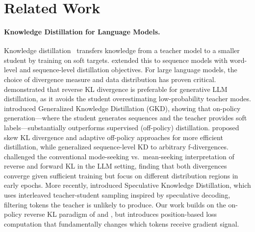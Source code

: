 
\section{Related Work}
\label{sec:related_work}

\paragraph{Knowledge Distillation for Language Models.}
Knowledge distillation~\citep{hinton2015distilling} transfers knowledge from a teacher model to a smaller student by training on soft targets.
\citet{kim2016sequence} extended this to sequence models with word-level and sequence-level distillation objectives.
For large language models, the choice of divergence measure and data distribution has proven critical.
\citet{gu2024minillm} demonstrated that reverse KL divergence is preferable for generative LLM distillation, as it avoids the student overestimating low-probability teacher modes.
\citet{agarwal2024onpolicy} introduced Generalized Knowledge Distillation (GKD), showing that on-policy generation---where the student generates sequences and the teacher provides soft labels---substantially outperforms supervised (off-policy) distillation.
\citet{ko2024distillm} proposed skew KL divergence and adaptive off-policy approaches for more efficient distillation, while \citet{wen2023fdivergence} generalized sequence-level KD to arbitrary f-divergences.
\citet{wu2025rethinking} challenged the conventional mode-seeking vs.\ mean-seeking interpretation of reverse and forward KL in the LLM setting, finding that both divergences converge given sufficient training but focus on different distribution regions in early epochs.
More recently, \citet{xu2025speculative} introduced Speculative Knowledge Distillation, which uses interleaved teacher-student sampling inspired by speculative decoding, filtering tokens the teacher is unlikely to produce.
Our work builds on the on-policy reverse KL paradigm of \citet{agarwal2024onpolicy} and \citet{gu2024minillm}, but introduces position-based loss computation that fundamentally changes which tokens receive gradient signal.

